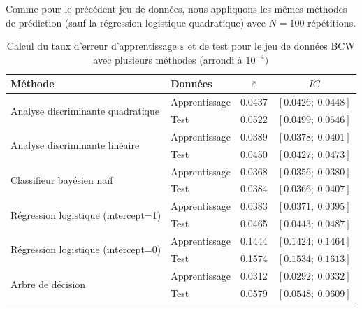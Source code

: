 \documentclass{article}
\begin{document}
Comme pour le précédent jeu de données, nous appliquons les mêmes méthodes de prédiction (sauf la régression logistique quadratique) avec $N=100$ répétitions.

\begin{table}[H]
\caption{Calcul du taux d'erreur d'apprentissage $\varepsilon$ et de test pour le jeu de données BCW avec plusieurs méthodes (arrondi à $10^{-4})$}
\centering

\begin{tabular}{l|l|cc}
\multicolumn{1}{l|}{\textbf{Méthode}}    & \textbf{Données} &$ \overline{\varepsilon}$ & $IC$                      \\ \hline
\multirow{2}{*}{Analyse discriminante quadratique} & Apprentissage    & 0.0437                                 & $\left[0.0426 ;~ 0.0448 \right]$  \\
                                       & Test             & 0.0522                                 & $\left[0.0499  ;~ 0.0546 \right]$ \\ \hline
\multirow{2}{*}{Analyse discriminante linéaire}                  & Apprentissage    & 0.0389                             & $\left[0.0378 ;~ 0.0401 \right]$  \\
                                       & Test             & 0.0450                       & $\left[0.0427 ;~ 0.0473 \right]$ \\ \hline
\multirow{2}{*}{Classifieur bayésien naïf}                  & Apprentissage    & 0.0368             & $\left[0.0356 ;~ 0.0380 \right]$  \\
                                       & Test             & 0.0384                                 & $\left[0.0366 ;~ 0.0407 \right]$ \\ \hline
\multirow{2}{*}{Régression logistique (intercept=1)}                  & Apprentissage    & 0.0383                             & $\left[0.0371 ;~ 0.0395 \right]$  \\
                                       & Test             & 0.0465                                 & $\left[0.0443;~ 0.0487 \right]$ \\ \hline
\multirow{2}{*}{Régression logistique (intercept=0)}                  & Apprentissage    & 0.1444                             & $\left[0.1424 ;~ 0.1464\right]$  \\
                                       & Test             & 0.1574                                 & $\left[0.1534 ;~ 0.1613 \right]$ \\ \hline

\multirow{2}{*}{Arbre de décision}                  & Apprentissage    & 0.0312                             & $\left[0.0292 ;~ 0.0332 \right]$  \\
                                       & Test             & 0.0579                                 & $\left[0.0548 ;~ 0.0609 \right]$ 
\end{tabular}


\label{err_bcw}
\end{table}
\end{document}
